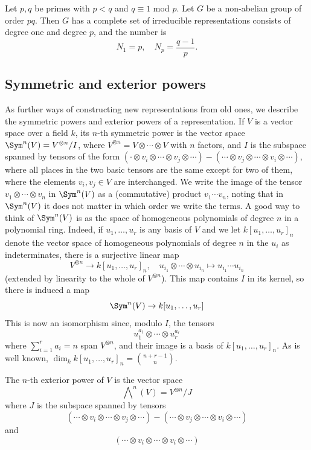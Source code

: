 \begin{corollary}\label{representation pq no abelian}
Let $p,q$ be primes with $p<q$ and $q\equiv 1$ mod $p$. Let $G$ be a non-abelian group of order $pq$. Then $G$ has a complete set of irreducible representations consists of degree one and degree $p$, and the number is
\[N_1=p,\quad N_p=\frac{q-1}{p}.\]
\end{corollary}
\subsection{Symmetric and exterior powers}
As further ways of constructing new representations from old ones, we describe the symmetric powers and exterior powers of a representation. If $V$ is a vector space over a field $k$, its $n$-th symmetric power is the vector space $\Sym^n(V)=V^{\otimes n}/I$, where $V^{\otimes n}=V\otimes\cdots\otimes V$ with $n$ factors, and $I$ is the subspace spanned by tensors of the form $(\cdot\otimes v_i\otimes\cdots\otimes v_j\otimes\cdots)-(\cdots\otimes v_j\otimes\cdots\otimes v_i\otimes\cdots)$, where all places in the two basic tensors are the same except for two of them, where the elements $v_i,v_j\in V$ are interchanged. We write the image of the tensor $v_1\otimes\cdots\otimes v_n$ in $\Sym^n(V)$ as a (commutative) product $v_1\cdots v_n$, noting that in $\Sym^n(V)$ it does not matter in which order we write the terms. A good way to think of $\Sym^n(V)$ is as the space of homogeneous polynomials of degree $n$ in a polynomial ring. Indeed, if $u_1,\dots,u_r$ is any basis of $V$ and we let $k[u_1,\dots,u_r]_n$ denote the vector space of homogeneous polynomials of degree $n$ in the $u_i$ as indeterminates, there is a surjective linear map
\[V^{\otimes n}\to k[u_1,\dots,u_r]_n,\quad u_{i_1}\otimes\cdots\otimes u_{i_n}\mapsto u_{i_1}\cdots u_{i_n}\]
(extended by linearity to the whole of $V^{\otimes n}$). This map contains $I$ in its kernel, so there is induced a map
\[\Sym^n(V)\to k[u_1,\dots,u_r]\]
This is now an isomorphism since, modulo $I$, the tensors
\[u_1^{a_1}\otimes\cdots\otimes u_r^{a_r}\]
where $\sum_{i=1}^{r}a_i=n$ span $V^{\otimes n}$, and their image is a basis of $k[u_1,\dots,u_r]_n$. As is well known, $\dim_kk[u_1,\dots,u_r]_n=\binom{n+r-1}{n}$.\par
The $n$-th exterior power of $V$ is the vector space
\[\bigwedge\nolimits^n(V)=V^{\otimes n}/J\]
where $J$ is the subspace spanned by tensors
\[(\cdots\otimes v_i\otimes\cdots\otimes v_j\otimes\cdots)-(\cdots\otimes v_j\otimes\cdots\otimes v_i\otimes\cdots)\]
and
\[(\cdots\otimes v_i\otimes\cdots\otimes v_i\otimes\cdots)\]
